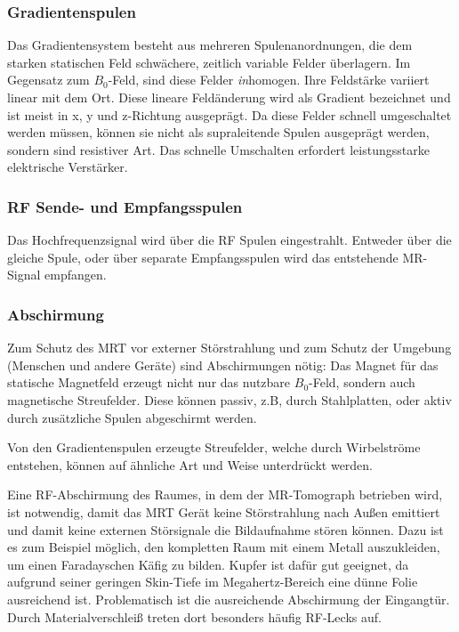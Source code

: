 \subsubsection{Gradientenspulen}
Das Gradientensystem besteht aus mehreren Spulenanordnungen, die dem starken statischen Feld schwächere, zeitlich variable Felder überlagern. Im Gegensatz zum $B_0$-Feld, sind diese Felder \textit{in}homogen. Ihre Feldstärke variiert linear mit dem Ort. Diese lineare Feldänderung wird als Gradient bezeichnet und ist meist in x, y und z-Richtung ausgeprägt. Da diese Felder schnell umgeschaltet werden müssen, können sie nicht als supraleitende Spulen ausgeprägt werden, sondern sind resistiver Art. Das schnelle Umschalten erfordert leistungsstarke elektrische Verstärker.


\subsubsection{RF Sende- und Empfangsspulen}
Das Hochfrequenzsignal wird über die RF Spulen eingestrahlt. Entweder über die gleiche Spule, oder über separate Empfangsspulen wird das entstehende MR-Signal empfangen.

\subsubsection{Abschirmung}
Zum Schutz des MRT vor externer Störstrahlung und zum Schutz der Umgebung (Menschen und andere Geräte) sind Abschirmungen nötig:
Das Magnet für das statische Magnetfeld erzeugt nicht nur das nutzbare $B_0$-Feld, sondern auch magnetische Streufelder. Diese können passiv, z.B, durch Stahlplatten, oder aktiv durch zusätzliche Spulen abgeschirmt werden.

Von den Gradientenspulen erzeugte Streufelder, welche durch Wirbelströme entstehen, können auf ähnliche Art und Weise unterdrückt werden.

Eine RF-Abschirmung des Raumes, in dem der MR-Tomograph betrieben wird, ist notwendig, damit das MRT Gerät keine Störstrahlung nach Außen emittiert und damit keine externen Störsignale die Bildaufnahme stören können.
Dazu ist es zum Beispiel möglich, den kompletten Raum mit einem Metall auszukleiden, um einen Faradayschen Käfig zu bilden. Kupfer ist dafür gut geeignet, da aufgrund seiner geringen Skin-Tiefe im Megahertz-Bereich eine dünne Folie ausreichend ist. \cite{Weibler1993} Problematisch ist die ausreichende Abschirmung der Eingangtür. Durch Materialverschleiß treten dort besonders häufig RF-Lecks auf.


